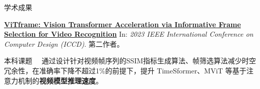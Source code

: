 \documentclass[a4paper]{article}
\newenvironment{cvitems}{
    \begin{justify}
    \begin{description}[
        labelwidth=2.0cm,
        leftmargin=2.5cm,
        labelsep=0.5cm,
        parsep=0pt,
        align=right
    ]
    
}{
    \end{description}
    \end{justify}
}
\def\section#1{
    \noindent\hskip2.5cm \textsf{\large #1} \hrulefill
}
\def\tip#1{{\kaishu #1}~\vrule~}
\begin{document}
    \section{学术成果}
    \begin{cvitems}

        \item[2023.10] \href{https://ieeexplore.ieee.org/abstract/document/10361019}{\faChalkboardTeacher{} \textbf{\textsf{ViTframe: Vision Transformer Acceleration via Informative Frame Selection for Video Recognition}}} In: \textit{2023 IEEE International Conference on Computer Design (ICCD)}. 第二作者。
        
        \tip{本科课题} 通过设计针对视频帧序列的SSIM指标生成算法、帧筛选算法减少时空冗余性，在准确率下降不超过1\%的前提下，提升 TimeSformer、MViT 等基于注意力机制的\textbf{视频模型推理速度}。
        
    \end{cvitems}

\end{document}
